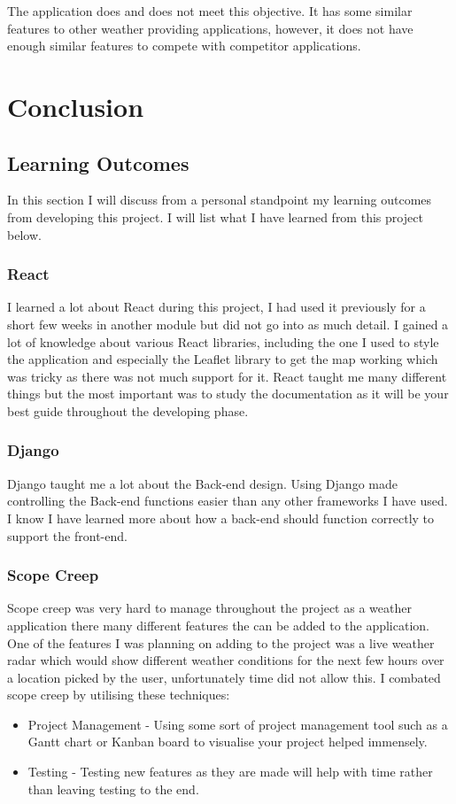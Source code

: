The application does and does not meet this objective. It has some similar features to other weather providing applications, however, it does not have enough similar features to compete with competitor applications. 

\chapter{Conclusion}
\section{Learning Outcomes}
In this section I will discuss from a personal standpoint my learning outcomes from developing this project. I will list what I have learned from this project below.

\subsection{React}
I learned a lot about React during this project, I had used it previously for a short few weeks in another module but did not go into as much detail. I gained a lot of knowledge about various React libraries, including the one I used to style the application and especially the Leaflet library to get the map working which was tricky as there was not much support for it. React taught me many different things but the most important was to study the documentation as it will be your best guide throughout the developing phase.

\subsection{Django}
Django taught me a lot about the Back-end design. Using Django made controlling the Back-end functions easier than any other frameworks I have used. I know I have learned more about how a back-end should function correctly to support the front-end.

\subsection{Scope Creep}
Scope creep was very hard to manage throughout the project as a weather application there many different features the can be added to the application. One of the features I was planning on adding to the project was a live weather radar which would show different weather conditions for the next few hours over a location picked by the user, unfortunately time did not allow this. I combated scope creep by utilising these techniques:
\begin{itemize}
    \item Project Management - Using some sort of project management tool such as a Gantt chart or Kanban board to visualise your project helped immensely.
    
    \item Testing - Testing new features as they are made will help with time rather than leaving testing to the end. 
    
\end{itemize}

